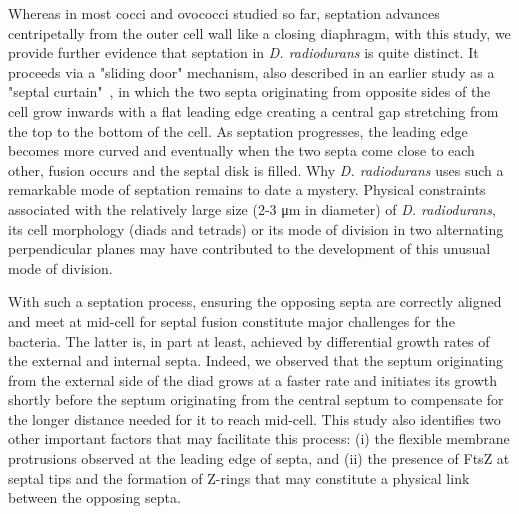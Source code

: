 Whereas in most cocci and ovococci studied so far, septation advances centripetally from the outer cell wall like a closing diaphragm, with this study, we provide further evidence that septation in \textit{D. radiodurans} is quite distinct.
It proceeds via a "sliding door" mechanism, also described in an earlier study as a "septal curtain"~\cite{murrayCellDivisionDeinococcus1983}, in which the two septa originating from opposite sides of the cell grow inwards with a flat leading edge creating a central gap stretching from the top to the bottom of the cell.
As septation progresses, the leading edge becomes more curved and eventually when the two septa come close to each other, fusion occurs and the septal disk is filled.
Why \textit{D. radiodurans} uses such a remarkable mode of septation remains to date a mystery.
Physical constraints associated with the relatively large size (2-3 μm in diameter) of \textit{D. radiodurans}, its cell morphology (diads and tetrads) or its mode of division in two alternating perpendicular planes may have contributed to the development of this unusual mode of division.

With such a septation process, ensuring the opposing septa are correctly aligned and meet at mid-cell for septal fusion constitute major challenges for the bacteria.
The latter is, in part at least, achieved by differential growth rates of the external and internal septa.
Indeed, we observed that the septum originating from the external side of the diad grows at a faster rate and initiates its growth shortly before the septum originating from the central septum to compensate for the longer distance needed for it to reach mid-cell.
This study also identifies two other important factors that may facilitate this process: (i) the flexible membrane protrusions observed at the leading edge of septa, and (ii) the presence of FtsZ at septal tips and the formation of Z-rings that may constitute a physical link between the opposing septa.

